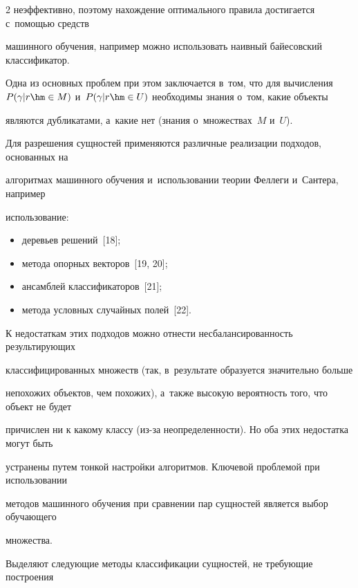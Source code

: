 \begin{multicols}{2}
неэффективно, поэтому нахождение оптимального правила достигается с~помощью средств

машинного обучения, например можно использовать наивный байесовский классификатор.

Одна из основных проблем при этом заключается в~том, что для вычисления $P(\gamma \vert

r \hm\in M)$ и~$P(\gamma\vert r \hm\in U)$ необходимы знания о~том, какие объекты

являются дубликатами, а~какие нет (знания о~множествах~$M$ и~$U$).



  Для разрешения сущностей применяются различные реализации подходов, основанных на

алгоритмах машинного обучения и~использовании теории Феллеги и~Сантера, например

использование:

  \begin{itemize}

\item деревьев решений~[18];

\item метода опорных векторов~[19, 20];

\item ансамблей классификаторов~[21];

\item метода условных случайных полей~[22].

\end{itemize}



  К недостаткам этих подходов можно отнести несбалансированность результирующих

классифицированных множеств (так, в~результате образуется значительно больше

непохожих объектов, чем похожих), а~также высокую вероятность того, что объект не будет

причислен ни к какому классу (из-за неопределенности). Но оба этих недостатка могут быть

устранены путем тонкой настройки алгоритмов. Ключевой проблемой при использовании

методов машинного обучения при сравнении пар сущностей является выбор обучающего

множества.



  Выделяют следующие методы классификации сущностей, не требующие построения


\end{multicols}
